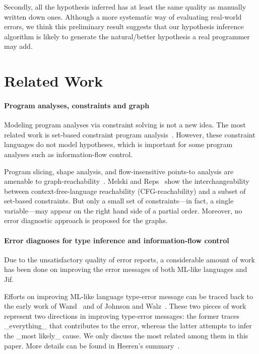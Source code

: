 Secondly, all the hypothesis inferred has at least the same quality as
manually written down ones. Although a more systematic way of
evaluating real-world errors, we think this preliminary result
suggests that our hypothesis inference algorithm is likely to generate
the natural/better hypothesis a real programmer may add.
 
\section{Related Work}

\paragraph{Program analyses, constraints and graph} 

Modeling program analyses via constraint solving is not a new idea.
The most related work is set-based constraint program
analysis~\cite{aiken-setconstraint, aiken-typeinclusion}.  However,
these constraint languages do not model hypotheses, which is important
for some program analyses such as information-flow control.
 
Program slicing, shape analysis, and flow-insensitive points-to
analysis are amenable to graph-reachability~\cite{reps-graph}. Melski
and Reps~\cite{melski-cflgraph} show the interchangeability between
context-free-language reachability (CFG-reachability) and a subset of
set-based constraints. But only a small set of constraints---in fact,
a single variable---may appear on the right hand side of a partial
order. Moreover, no error diagnostic approach is proposed for the
graphs.

\paragraph{Error diagnoses for type inference
	    and information-flow control} 

Due to the unsatisfactory quality of error reports, a considerable
amount of work has been done on improving the error messages of both
ML-like languages and Jif.

Efforts on improving ML-like language type-error message can be
traced back to the early work of Wand~\cite{wand-errorfinding} and
of Johnson and Walz~\cite{johnson-popl86}. These two pieces of work
represent two directions in improving type-error messages: the former
traces _everything_ that contributes to the error, whereas the
latter attempts to infer the _most likely_ cause. We only discuss the
most related among them in this paper. More details can be found in
Heeren's summary~\cite{heeren:thesis}.

